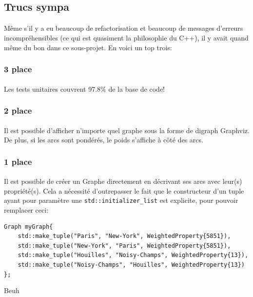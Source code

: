 \documentclass[french]{article}
\begin{document}
\subsection{Trucs sympa}

\paragraph{} Même s'il y a eu beaucoup de refactorisation et beaucoup de
messages d'erreurs incompréhensibles (ce qui est quasiment la philosophie du
C++), il y avait quand même du bon dans ce sous-projet. En voici un top trois:

\subsubsection{3\ieme{} place}

\paragraph{} Les tests unitaires couvrent 97.8\% de la base de code! \Smiley{}

\subsubsection{2\ieme{} place}

\paragraph{} Il est possible d'afficher n'importe quel graphe sous la forme de
digraph Graphviz. De plus, si les arcs sont pondérés, le poids s'affiche à côté
des arcs.

\subsubsection{1\iere{} place}

\paragraph{} Il est possible de créer un Graphe directement en décrivant ses
arcs avec leur(s) propriété(s). Cela a nécessité d'outrepasser le fait que le
constructeur d'un tuple ayant pour paramètre une
\texttt{std::initializer_list} est explicite, pour pouvoir remplacer
ceci:

\begin{listing}[H]
\begin{verbatim}
Graph myGraph{
	std::make_tuple("Paris", "New-York", WeightedProperty{5851}),
	std::make_tuple("New-York", "Paris", WeightedProperty{5851}),
	std::make_tuple("Houilles", "Noisy-Champs", WeightedProperty{13}),
	std::make_tuple("Noisy-Champs", "Houilles", WeightedProperty{13})
};
\end{verbatim}
\caption{Beuh}
\label{tsp:beuh}
\end{listing}
\end{document}
